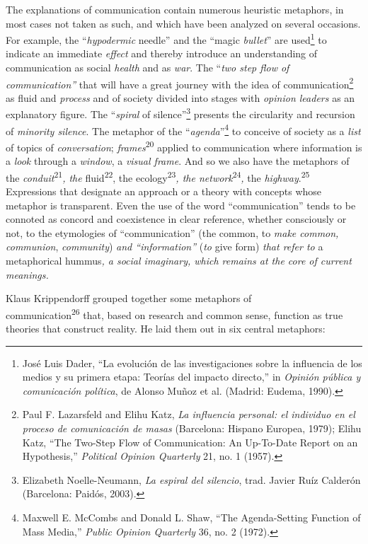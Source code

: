 \documentclass{tufte-handout}
\begin{document}
The explanations of communication contain numerous heuristic metaphors,
in most cases not taken as such, and which have been analyzed on several
occasions. For example, the ``\emph{hypodermic} needle'' and the ``magic
\emph{bullet}'' are used\footnote{José Luis Dader, ``La evolución de las
  investigaciones sobre la influencia de los medios y su primera etapa:
  Teorías del impacto directo,'' in \emph{Opinión pública y comunicación
  política}, de Alonso Muñoz et al. (Madrid: Eudema, 1990).} to indicate
an immediate \emph{effect} and thereby introduce an understanding of
communication as social \emph{health} and as \emph{war}. The ``\emph{two
step flow of communication''} that will have a great journey with the
idea of communication\footnote{Paul F. Lazarsfeld and Elihu Katz,
  \emph{La influencia personal: el individuo en el proceso de
  comunicación de masas} (Barcelona: Hispano Europea, 1979); Elihu Katz,
  ``The Two-Step Flow of Communication: An Up-To-Date Report on an
  Hypothesis,'' \emph{Political Opinion Quarterly} 21, no. 1 (1957).} as
fluid and \emph{process} and of society divided into stages with
\emph{opinion leaders} as an explanatory figure. The ``\emph{spiral} of
silence''\footnote{Elizabeth Noelle-Neumann, \emph{La espiral del
  silencio}, trad. Javier Ruíz Calderón (Barcelona: Paidós, 2003).}
presents the circularity and recursion of \emph{minority silence}. The
metaphor of the ``\emph{agenda}''\footnote{Maxwell E. McCombs and Donald
  L. Shaw, ``The Agenda-Setting Function of Mass Media,'' \emph{Public
  Opinion Quarterly} 36, no. 2 (1972).} to conceive of society as a
\emph{list} of topics of \emph{conversation}; \emph{frames}\textsuperscript{20} applied to communication where
information is a \emph{look} through a \emph{window}, a \emph{visual
frame}. And so we also have the metaphors of the
\emph{conduit}\textsuperscript{21}\emph{, the}
fluid\textsuperscript{22}, the
ecology\textsuperscript{23}\emph{, the network}\textsuperscript{24}\emph{,} the \emph{highway}.\textsuperscript{25} Expressions that
designate an approach or a theory with concepts whose metaphor is
transparent. Even the use of the word ``communication'' tends to be
connoted as concord and coexistence in clear reference, whether
consciously or not, to the etymologies of ``communication'' (the common,
to \emph{make common, communion}, \emph{community}) \emph{and
``information'' }(\emph{to} give form)\emph{ that refer to} a
metaphorical hummus\emph{, a social imaginary, which remains at the core
of current meanings.}


Klaus Krippendorff grouped together some metaphors of\\\noindent
communication\textsuperscript{26} that, based on research
and common sense, function as true theories that construct reality. He
laid them out in six central metaphors:
\end{document}
